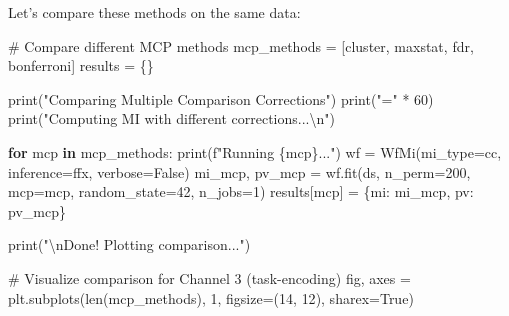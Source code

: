 \documentclass[
  11pt,
  letterpaper,
  oneside,
  openany]{book}
\newenvironment{Shaded}{\begin{snugshade}}{\end{snugshade}}
\newcommand{\BuiltInTok}[1]{\textcolor[rgb]{0.00,0.23,0.31}{#1}}
\newcommand{\CharTok}[1]{\textcolor[rgb]{0.13,0.47,0.30}{#1}}
\newcommand{\CommentTok}[1]{\textcolor[rgb]{0.37,0.37,0.37}{#1}}
\newcommand{\ControlFlowTok}[1]{\textcolor[rgb]{0.00,0.23,0.31}{\textbf{#1}}}
\newcommand{\DecValTok}[1]{\textcolor[rgb]{0.68,0.00,0.00}{#1}}
\newcommand{\KeywordTok}[1]{\textcolor[rgb]{0.00,0.23,0.31}{\textbf{#1}}}
\newcommand{\NormalTok}[1]{\textcolor[rgb]{0.00,0.23,0.31}{#1}}
\newcommand{\OperatorTok}[1]{\textcolor[rgb]{0.37,0.37,0.37}{#1}}
\newcommand{\SpecialCharTok}[1]{\textcolor[rgb]{0.37,0.37,0.37}{#1}}
\newcommand{\SpecialStringTok}[1]{\textcolor[rgb]{0.13,0.47,0.30}{#1}}
\newcommand{\StringTok}[1]{\textcolor[rgb]{0.13,0.47,0.30}{#1}}
\newcommand{\VariableTok}[1]{\textcolor[rgb]{0.07,0.07,0.07}{#1}}
\begin{document}
Let's compare these methods on the same data:

\begin{Shaded}
\begin{Highlighting}[]
\CommentTok{\# Compare different MCP methods}
\NormalTok{mcp\_methods }\OperatorTok{=}\NormalTok{ [}\StringTok{\textquotesingle{}cluster\textquotesingle{}}\NormalTok{, }\StringTok{\textquotesingle{}maxstat\textquotesingle{}}\NormalTok{, }\StringTok{\textquotesingle{}fdr\textquotesingle{}}\NormalTok{, }\StringTok{\textquotesingle{}bonferroni\textquotesingle{}}\NormalTok{]}
\NormalTok{results }\OperatorTok{=}\NormalTok{ \{\}}

\BuiltInTok{print}\NormalTok{(}\StringTok{"Comparing Multiple Comparison Corrections"}\NormalTok{)}
\BuiltInTok{print}\NormalTok{(}\StringTok{"="} \OperatorTok{*} \DecValTok{60}\NormalTok{)}
\BuiltInTok{print}\NormalTok{(}\StringTok{"Computing MI with different corrections...}\CharTok{\textbackslash{}n}\StringTok{"}\NormalTok{)}

\ControlFlowTok{for}\NormalTok{ mcp }\KeywordTok{in}\NormalTok{ mcp\_methods:}
    \BuiltInTok{print}\NormalTok{(}\SpecialStringTok{f"Running }\SpecialCharTok{\{}\NormalTok{mcp}\SpecialCharTok{\}}\SpecialStringTok{..."}\NormalTok{)}
\NormalTok{    wf }\OperatorTok{=}\NormalTok{ WfMi(mi\_type}\OperatorTok{=}\StringTok{\textquotesingle{}cc\textquotesingle{}}\NormalTok{, inference}\OperatorTok{=}\StringTok{\textquotesingle{}ffx\textquotesingle{}}\NormalTok{, verbose}\OperatorTok{=}\VariableTok{False}\NormalTok{)}
\NormalTok{    mi\_mcp, pv\_mcp }\OperatorTok{=}\NormalTok{ wf.fit(ds, n\_perm}\OperatorTok{=}\DecValTok{200}\NormalTok{, mcp}\OperatorTok{=}\NormalTok{mcp, random\_state}\OperatorTok{=}\DecValTok{42}\NormalTok{, n\_jobs}\OperatorTok{=}\DecValTok{1}\NormalTok{)}
\NormalTok{    results[mcp] }\OperatorTok{=}\NormalTok{ \{}\StringTok{\textquotesingle{}mi\textquotesingle{}}\NormalTok{: mi\_mcp, }\StringTok{\textquotesingle{}pv\textquotesingle{}}\NormalTok{: pv\_mcp\}}

\BuiltInTok{print}\NormalTok{(}\StringTok{"}\CharTok{\textbackslash{}n}\StringTok{Done! Plotting comparison..."}\NormalTok{)}

\CommentTok{\# Visualize comparison for Channel 3 (task{-}encoding)}
\NormalTok{fig, axes }\OperatorTok{=}\NormalTok{ plt.subplots(}\BuiltInTok{len}\NormalTok{(mcp\_methods), }\DecValTok{1}\NormalTok{, figsize}\OperatorTok{=}\NormalTok{(}\DecValTok{14}\NormalTok{, }\DecValTok{12}\NormalTok{), sharex}\OperatorTok{=}\VariableTok{True}\NormalTok{)}


\end{Highlighting}
\end{Shaded}
\end{document}
